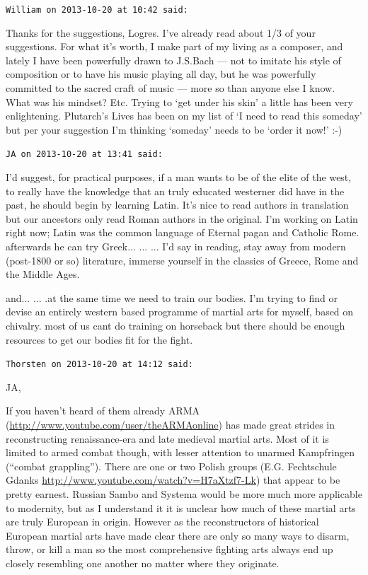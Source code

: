 \begin{footnotesize}
\begin{sffamily}
\hfill

\texttt{William on 2013-10-20 at 10:42 said:}

Thanks for the suggestions, Logres. I've already read about 1/3 of your suggestions. For what it's worth, I make part of my living as a composer, and lately I have been powerfully drawn to J.S.Bach --- not to imitate his style of composition or to have his music playing all day, but he was powerfully committed to the sacred craft of music --- more so than anyone else I know. What was his mindset? Etc. Trying to `get under his skin' a little has been very enlightening. Plutarch's Lives has been on my list of `I need to read this someday' but per your suggestion I'm thinking `someday' needs to be `order it now!' :-)

\hfill

\texttt{JA on 2013-10-20 at 13:41 said:}

I'd suggest, for practical purposes, if a man wants to be of the elite of the west, to really have the knowledge that an truly educated westerner did have in the past, he should begin by learning Latin. It's nice to read authors in translation but our ancestors only read Roman authors in the original. I'm working on Latin right now; Latin was the common language of Eternal pagan and Catholic Rome. afterwards he can try Greek... ... ... I'd say in reading, stay away from modern (post-1800 or so) literature, immerse yourself in the classics of Greece, Rome and the Middle Ages.

and... ... .at the same time we need to train our bodies. I'm trying to find or devise an entirely western based programme of martial arts for myself, based on chivalry. most of us cant do training on horseback but there should be enough resources to get our bodies fit for the fight.

\hfill

\texttt{Thorsten on 2013-10-20 at 14:12 said:}

JA,

If you haven't heard of them already ARMA (\url{http://www.youtube.com/user/theARMAonline}) has made great strides in reconstructing renaissance-era and late medieval martial arts. Most of it is limited to armed combat though, with lesser attention to unarmed Kampfringen (``combat grappling''). There are one or two Polish groups (E.G. Fechtschule Gdanks \url{http://www.youtube.com/watch?v=H7aXtzf7-Lk}) that appear to be pretty earnest. Russian Sambo and Systema would be more much more applicable to modernity, but as I understand it it is unclear how much of these martial arts are truly European in origin. However as the reconstructors of historical European martial arts have made clear there are only so many ways to disarm, throw, or kill a man so the most comprehensive fighting arts always end up closely resembling one another no matter where they originate.


\end{sffamily}
\end{footnotesize}
